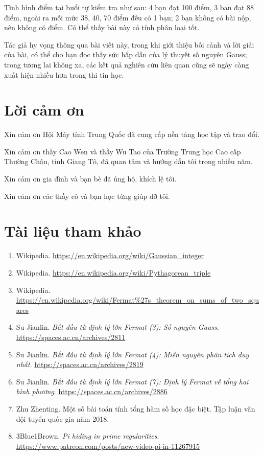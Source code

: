 \documentclass[11pt]{article}
\begin{document}
Tình hình điểm tại buổi tự kiểm tra như sau: 4 bạn đạt 100 điểm, 3 bạn đạt 88
điểm, ngoài ra mỗi mức 38, 40, 70 điểm đều có 1 bạn; 2 bạn không có bài nộp,
nên không có điểm. Có thể thấy bài này có tính phân loại tốt.

Tác giả hy vọng thông qua bài viết này, trong khi giới thiệu bối cảnh và lời
giải của bài, có thể cho bạn đọc thấy sức hấp dẫn của lý thuyết số nguyên
Gauss; trong tương lai không xa, các kết quả nghiên cứu liên quan cũng sẽ ngày
càng xuất hiện nhiều hơn trong thi tin học.

\section*{Lời cảm ơn}

Xin cảm ơn Hội Máy tính Trung Quốc đã cung cấp nền tảng học tập và trao đổi.

Xin cảm ơn thầy Cao Wen và thầy Wu Tao của Trường Trung học Cao cấp Thường
Châu, tỉnh Giang Tô, đã quan tâm và hướng dẫn tôi trong nhiều năm.

Xin cảm ơn gia đình và bạn bè đã ủng hộ, khích lệ tôi.

Xin cảm ơn các thầy cô và bạn học từng giúp đỡ tôi.

\section*{Tài liệu tham khảo}

\begingroup
\raggedright
\begin{enumerate}
  \item Wikipedia. \url{https://en.wikipedia.org/wiki/Gaussian_integer}
  \item Wikipedia. \url{https://en.wikipedia.org/wiki/Pythagorean_triple}
  \item Wikipedia.
        \url{https://en.wikipedia.org/wiki/Fermat%27s_theorem_on_sums_of_two_squares}
  \item Su Jianlin. \emph{Bắt đầu từ định lý lớn Fermat (3): Số nguyên
        Gauss}. \url{https://spaces.ac.cn/archives/2811}
  \item Su Jianlin. \emph{Bắt đầu từ định lý lớn Fermat (4): Miền nguyên phân
        tích duy nhất}. \url{https://spaces.ac.cn/archives/2819}
  \item Su Jianlin. \emph{Bắt đầu từ định lý lớn Fermat (7): Định lý Fermat về
        tổng hai bình phương}. \url{https://spaces.ac.cn/archives/2886}
  \item Zhu Zhenting. Một số bài toán tính tổng hàm số học đặc biệt. Tập luận
        văn đội tuyển quốc gia năm 2018.
  \item 3Blue1Brown. \emph{Pi hiding in prime regularities}.
        \url{https://www.patreon.com/posts/new-video-pi-in-11267915}
\end{enumerate}
\endgroup
\end{document}
